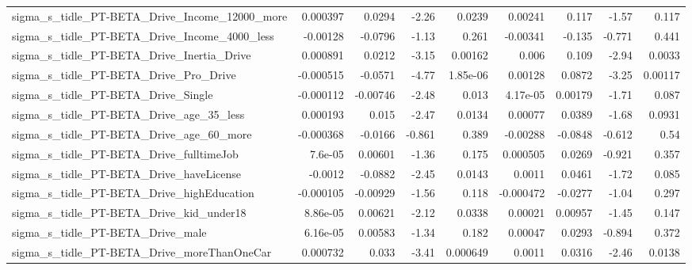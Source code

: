 \begin{tabular}{lrrrrrrrr}
sigma\_s\_tidle\_PT-BETA\_Drive\_Income\_12000\_more      &    0.000397 &       0.0294 &    -2.26 &   0.0239 &    0.00241 &       0.117 &        -1.57 &         0.117 \\
sigma\_s\_tidle\_PT-BETA\_Drive\_Income\_4000\_less       &    -0.00128 &      -0.0796 &    -1.13 &    0.261 &   -0.00341 &      -0.135 &       -0.771 &         0.441 \\
sigma\_s\_tidle\_PT-BETA\_Drive\_Inertia\_Drive          &    0.000891 &       0.0212 &    -3.15 &  0.00162 &      0.006 &       0.109 &        -2.94 &        0.0033 \\
sigma\_s\_tidle\_PT-BETA\_Drive\_Pro\_Drive              &   -0.000515 &      -0.0571 &    -4.77 & 1.85e-06 &    0.00128 &      0.0872 &        -3.25 &       0.00117 \\
sigma\_s\_tidle\_PT-BETA\_Drive\_Single                 &   -0.000112 &     -0.00746 &    -2.48 &    0.013 &   4.17e-05 &     0.00179 &        -1.71 &         0.087 \\
sigma\_s\_tidle\_PT-BETA\_Drive\_age\_35\_less            &    0.000193 &        0.015 &    -2.47 &   0.0134 &    0.00077 &      0.0389 &        -1.68 &        0.0931 \\
sigma\_s\_tidle\_PT-BETA\_Drive\_age\_60\_more            &   -0.000368 &      -0.0166 &   -0.861 &    0.389 &   -0.00288 &     -0.0848 &       -0.612 &          0.54 \\
sigma\_s\_tidle\_PT-BETA\_Drive\_fulltimeJob            &     7.6e-05 &      0.00601 &    -1.36 &    0.175 &   0.000505 &      0.0269 &       -0.921 &         0.357 \\
sigma\_s\_tidle\_PT-BETA\_Drive\_haveLicense            &     -0.0012 &      -0.0882 &    -2.45 &   0.0143 &     0.0011 &      0.0461 &        -1.72 &         0.085 \\
sigma\_s\_tidle\_PT-BETA\_Drive\_highEducation          &   -0.000105 &     -0.00929 &    -1.56 &    0.118 &  -0.000472 &     -0.0277 &        -1.04 &         0.297 \\
sigma\_s\_tidle\_PT-BETA\_Drive\_kid\_under18            &    8.86e-05 &      0.00621 &    -2.12 &   0.0338 &    0.00021 &     0.00957 &        -1.45 &         0.147 \\
sigma\_s\_tidle\_PT-BETA\_Drive\_male                   &    6.16e-05 &      0.00583 &    -1.34 &    0.182 &    0.00047 &      0.0293 &       -0.894 &         0.372 \\
sigma\_s\_tidle\_PT-BETA\_Drive\_moreThanOneCar         &    0.000732 &        0.033 &    -3.41 & 0.000649 &     0.0011 &      0.0316 &        -2.46 &        0.0138 \\

\end{tabular}
